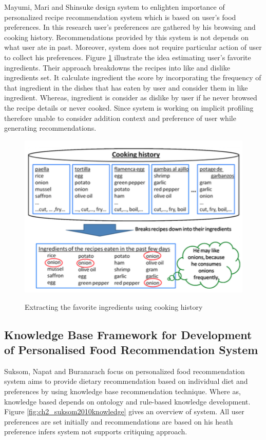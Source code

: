 Mayumi, Mari and Shinsuke \cite{ueda2011user} design system to enlighten importance of personalized recipe recommendation system which is based on user’s food preferences. In this research user’s preferences are gathered by his browsing and cooking history. Recommendations provided by this system is not depends on what user ate in past. Moreover, system does not require particular action of user to collect his preferences.  Figure \ref{fig:ch2_ueda2011user} illustrate the idea estimating user’s favorite ingredients. Their approach breakdowns the recipes into like and dislike ingredients set. It calculate ingredient the score by incorporating the frequency of that ingredient in the dishes that has eaten by user and consider them in like ingredient. Whereas, ingredient is consider as dislike by user if he never browsed the recipe details or never cooked. Since system is working on implicit profiling therefore unable to consider addition context and preference of user while generating recommendations.

\begin{figure}[h]
	\centering
	\includegraphics[width=1\linewidth]{figures/ch2_ueda2011user.png}
	\caption{Extracting the favorite ingredients using cooking history}
	\cite{ueda2011user}
	\label{fig:ch2_ueda2011user}
\end{figure}

\subsection{Knowledge Base Framework for Development of Personalised Food Recommendation System}
Suksom, Napat and Buranarach \cite{suksom2010knowledge} focus on personalized food recommendation system aims to provide dietary recommendation based on individual diet and preferences by using knowledge base recommendation technique. Where as, knowledge based depends on ontology and rule-based knowledge development. Figure \ref{fig:ch2_suksom2010knowledge} gives an overview of system. All user preferences are set initially and recommendations are based on his heath preference infers system not supports critiquing approach.  

